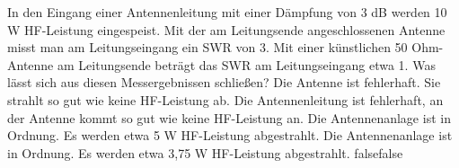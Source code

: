     {In den Eingang einer Antennenleitung mit einer Dämpfung von 3 dB werden 10 W HF-Leistung eingespeist. Mit der am Leitungsende angeschlossenen Antenne misst man am Leitungseingang ein SWR von 3. Mit einer künstlichen 50 Ohm-Antenne am Leitungsende beträgt das SWR am Leitungseingang etwa 1. Was lässt sich aus diesen Messergebnissen schließen?}
    {Die Antenne ist fehlerhaft. Sie strahlt so gut wie keine HF-Leistung ab.}
    {Die Antennenleitung ist fehlerhaft, an der Antenne kommt so gut wie keine HF-Leistung an.}
    {Die Antennenanlage ist in Ordnung. Es werden etwa 5 W HF-Leistung abgestrahlt.}
    {Die Antennenanlage ist in Ordnung. Es werden etwa 3,75 W HF-Leistung abgestrahlt.}
    {false}{false}